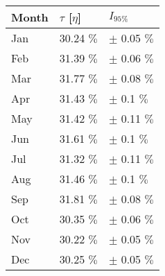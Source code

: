 \begin{tabular}{lll}
\toprule
Month & $\tau$ [$\eta$] &       $I_{95\%}$ \\
\midrule
  Jan &      30.24 $\%$ &  $\pm$ 0.05 $\%$ \\
  Feb &      31.39 $\%$ &  $\pm$ 0.06 $\%$ \\
  Mar &      31.77 $\%$ &  $\pm$ 0.08 $\%$ \\
  Apr &      31.43 $\%$ &   $\pm$ 0.1 $\%$ \\
  May &      31.42 $\%$ &  $\pm$ 0.11 $\%$ \\
  Jun &      31.61 $\%$ &   $\pm$ 0.1 $\%$ \\
  Jul &      31.32 $\%$ &  $\pm$ 0.11 $\%$ \\
  Aug &      31.46 $\%$ &   $\pm$ 0.1 $\%$ \\
  Sep &      31.81 $\%$ &  $\pm$ 0.08 $\%$ \\
  Oct &      30.35 $\%$ &  $\pm$ 0.06 $\%$ \\
  Nov &      30.22 $\%$ &  $\pm$ 0.05 $\%$ \\
  Dec &      30.25 $\%$ &  $\pm$ 0.05 $\%$ \\
\bottomrule
\end{tabular}
